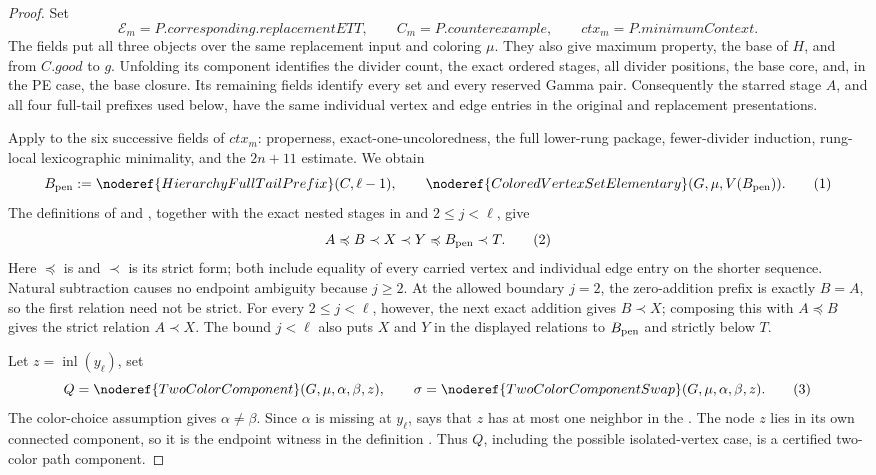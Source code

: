 \begin{proof}
Set
\[
 \mathcal E_m=P.\mathit{corresponding.replacementETT},\qquad
 C_m=P.\mathit{counterexample},\qquad
 \mathit{ctx}_m=P.\mathit{minimumContext}.
\]
The  fields put all three
objects over the same replacement input and coloring \(\mu\).  They also
give maximum property, the base of \(H\), and
 from \(C.\mathit{good}\) to \(g\).
Unfolding its  component identifies the
divider count, the exact ordered stages, all divider positions, the base
core, and, in the PE case, the base closure.  Its remaining fields
identify every  set and every reserved
Gamma pair.  Consequently the starred stage \(A\), and all four full-tail
prefixes used below, have the same individual vertex and edge entries in
the original and replacement presentations.

Apply  to the six
successive fields of \(\mathit{ctx}_m\): properness,
exact-one-uncoloredness, the full lower-rung package, fewer-divider
induction, rung-local lexicographic minimality, and the \(2n+11\)
estimate.  We obtain
\[
 B_{\rm pen}:=\noderef{HierarchyFullTailPrefix}(C,\ell-1),\qquad
 \noderef{ColoredVertexSetElementary}(G,\mu,V(B_{\rm pen})).       \tag{1}
\]
The definitions of  and
, together with the exact nested stages
in  and \(2\le j<\ell\), give
\[
 A\preccurlyeq B\prec X\prec Y\preccurlyeq B_{\rm pen}\prec T. \tag{2}
\]
Here \(\preccurlyeq\) is  and
\(\prec\) is its strict form; both include equality of every carried
vertex and individual edge entry on the shorter sequence.  Natural
subtraction causes no endpoint ambiguity because \(j\ge2\).  At the
allowed boundary \(j=2\), the zero-addition prefix is exactly \(B=A\),
so the first relation need not be strict.  For every \(2\le j<\ell\),
however, the next exact addition gives \(B\prec X\); composing this with
\(A\preccurlyeq B\) gives the strict relation \(A\prec X\).  The bound
\(j<\ell\) also puts \(X\) and \(Y\) in the displayed relations to
\(B_{\rm pen}\) and strictly below \(T\).

Let \(z=\operatorname{inl}(y_\ell)\), set
\[
 Q=\noderef{TwoColorComponent}(G,\mu,\alpha,\beta,z),\qquad
 \sigma=\noderef{TwoColorComponentSwap}(G,\mu,\alpha,\beta,z).    \tag{3}
\]
The color-choice assumption gives \(\alpha\ne\beta\).  Since \(\alpha\)
is missing at \(y_\ell\),
 says that \(z\) has at most one
neighbor in the .  The node \(z\) lies in
its own connected component, so it is the endpoint witness in the
definition .  Thus \(Q\), including the
possible isolated-vertex case, is a certified two-color path component.


\end{proof}
